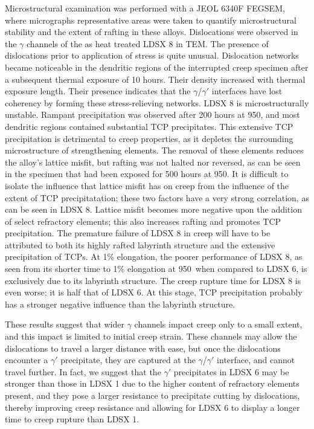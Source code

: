 Microstructural examination was performed with a JEOL 6340F FEGSEM, where micrographs representative areas were taken to quantify microstructural stability and the extent of rafting in these alloys. Dislocations were observed in the $\gamma$ channels of the as heat treated LDSX 8 in TEM. The presence of dislocations prior to application of stress is quite unusual. Dislocation networks became noticeable in the dendritic regions of the interrupted creep specimen after a subsequent thermal exposure of 10 hours. Their density increased with thermal exposure length. Their presence indicates that the $\gamma$/$\gamma'$ interfaces have lost coherency by forming these stress-relieving networks. LDSX 8 is microstructurally unstable. Rampant precipitation was observed after 200 hours at 950\celsius, and most dendritic regions contained substantial TCP precipitates. This extensive TCP precipitation is detrimental to creep properties, as it depletes the surrounding microstructure of strengthening elements. The removal of these elements reduces the alloy's lattice misfit, but rafting was not halted nor reversed, as can be seen in the specimen that had been exposed for 500 hours at 950\celsius. It is difficult to isolate the influence that lattice misfit has on creep from the influence of the extent of TCP precipitatation; these two factors have a very strong correlation, as can be seen in LDSX 8. Lattice misfit becomes more negative upon the addition of select refractory elements; this also increases rafting and promotes TCP precipitation. The premature failure of LDSX 8 in creep will have to be attributed to both its highly rafted labyrinth structure and the extensive precipitation of TCPs. At 1\% elongation, the poorer performance of LDSX 8, as seen from its shorter time to 1\% elongation at 950\celsius\ when compared to LDSX 6, is exclusively due to its labyrinth structure. The creep rupture time for LDSX 8 is even worse; it is half that of LDSX 6. At this stage, TCP precipitation probably has a stronger negative influence than the labyrinth structure.

These results suggest that wider $\gamma$ channels impact creep only to a small extent, and this impact is limited to initial creep strain. These channels may allow the dislocations to travel a larger distance with ease, but once the dislocations encounter a $\gamma'$ precipitate, they are captured at the $\gamma$/$\gamma'$ interface, and cannot travel further. In fact, we suggest that the $\gamma'$ precipitates in LDSX 6 may be stronger than those in LDSX 1 due to the higher content of refractory elements present, and they pose a larger resistance to precipitate cutting by dislocations, thereby improving creep resistance and allowing for LDSX 6 to display a longer time to creep rupture than LDSX 1.

